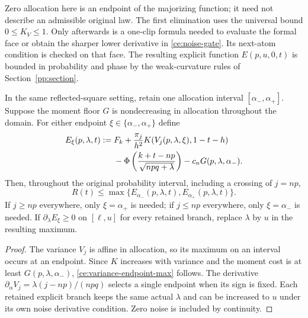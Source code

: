 Zero allocation here is an endpoint of the majorizing function; it need
not describe an admissible original law. The first elimination uses the
universal bound $0\le K_V\le1$. Only afterwards is a one-clip formula
needed to evaluate the formal face or obtain the sharper lower derivative
in \eqref{ce:noise-gate}. Its next-atom condition is checked on that face.
The resulting explicit function $E(p,u,0,t)$ is bounded in probability
and phase by the weak-curvature rules of Section~\ref{pp:section}.

\begin{corollary}\label{ce:allocation-interval}
In the same reflected-square setting, retain one allocation interval
$[\alpha_-,\alpha_+]$. Suppose the moment floor $G$ is nondecreasing
in allocation throughout the domain. For either endpoint
$\xi\in\{\alpha_-,\alpha_+\}$ define
\begin{align}\label{ce:two-corners}
 E_{\xi}(p,\lambda,t):={}&F_k+
 \frac{\pi_j}{h^2}K(V_j(p,\lambda,\xi),1-t-h)\notag\\
 &-\Phi\left(\frac{k+t-np}{\sqrt{npq+\lambda}}\right)
 -c_nG(p,\lambda,\alpha_-).
\end{align}
Then, throughout the original probability interval, including a crossing
of $j=np$,
\begin{equation}\label{ce:variance-endpoint-max}
 R(t)\le\max\{E_{\alpha_-}(p,\lambda,t),
              E_{\alpha_+}(p,\lambda,t)\}.
\end{equation}
If $j\ge np$ everywhere, only $\xi=\alpha_+$ is needed;
if $j\le np$ everywhere, only $\xi=\alpha_-$ is needed.
If $\partial_\lambda E_\xi\ge0$ on $[\ell,u]$ for every retained
branch, replace $\lambda$ by $u$ in the resulting maximum.
\end{corollary}
\begin{proof}
The variance $V_j$ is affine in allocation, so its maximum on an
interval occurs at an endpoint. Since $K$ increases with variance
and the moment cost is at least $G(p,\lambda,\alpha_-)$,
\eqref{ce:variance-endpoint-max} follows. The derivative
$\partial_\alpha V_j=\lambda(j-np)/(npq)$ selects a single endpoint
when its sign is fixed. Each retained explicit branch keeps the
same actual $\lambda$ and can be increased to $u$ under its own
noise derivative condition. Zero noise is included by continuity.
\end{proof}

